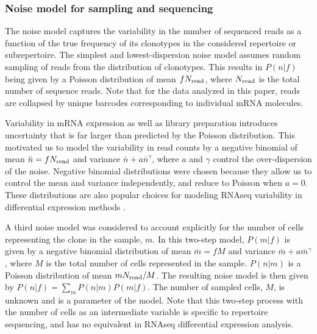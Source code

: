 \subsubsection*{Noise model for sampling and sequencing}

The noise model captures the variability in the number of sequenced reads as a function of the true frequency of its clonotypes in the considered repertoire or subrepertoire. The simplest and lowest-dispersion noise model assumes random sampling of reads from the distribution of clonotypes. This results in $P(n|f)$ being given by a Poisson distribution of mean $fN_{\rm read}$, where $N_{\rm read}$ is the total number of sequence reads. Note that for the data analyzed in this paper, reads are collapsed by unique barcodes corresponding to individual mRNA molecules. 

Variability in mRNA expression as well as library preparation introduces uncertainty that is far larger than predicted by the Poisson distribution. This motivated us to model the variability in read counts by a negative binomial of mean $\bar n=fN_{\rm read}$ and variance $\bar n+a\bar n^\gamma$, where $a$ and $\gamma$ control the over-dispersion of the noise. Negative binomial distributions were chosen because they allow us to control the mean and variance independently, and reduce to Poisson when $a=0$. These distributions are also popular choices for modeling RNAseq variability in differential expression methods \cite{Robinson2010,Love2014}.

A third noise model was considered to account explicitly for the number of cells representing the clone in the sample, $m$. In this two-step model, $P(m|f)$ is given by a negative binomial distribution of mean $\bar m=fM$ and variance $\bar m+a\bar m^\gamma$, where $M$ is the total number of cells represented in the sample. $P(n|m)$ is a Poisson distribution of mean $mN_{\rm read}/M$. The resulting noise model is then given by $P(n|f)=\sum_m P(n|m)P(m|f)$. The number of sampled cells, $M$, is unknown and is a parameter of the model. Note that this two-step process with the number of cells as an intermediate variable is specific to repertoire sequencing, and has no equivalent in RNAseq differential expression analysis.

